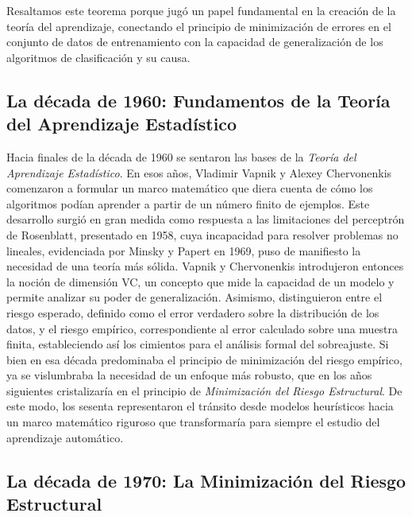 \documentclass{report}
\begin{document}
Resaltamos este teorema porque jugó un papel fundamental en la creación de la teoría del aprendizaje, conectando el
principio de minimización de errores en el conjunto de datos de entrenamiento con la capacidad de generalización
de los algoritmos de clasificación y su causa.\newline


\subsection{La década de 1960: Fundamentos de la Teoría del Aprendizaje Estadístico}

Hacia finales de la década de 1960 se sentaron las bases de la \textit{Teoría del Aprendizaje Estadístico}. En esos años, Vladimir Vapnik y Alexey Chervonenkis comenzaron a formular un marco matemático que diera cuenta de cómo los algoritmos podían aprender a partir de un número finito de ejemplos. Este desarrollo surgió en gran medida como respuesta a las limitaciones del perceptrón de Rosenblatt, presentado en 1958, cuya incapacidad para resolver problemas no lineales, evidenciada por Minsky y Papert en 1969, puso de manifiesto la necesidad de una teoría más sólida. Vapnik y Chervonenkis introdujeron entonces la noción de dimensión VC, un concepto que mide la capacidad de un modelo y permite analizar su poder de generalización. Asimismo, distinguieron entre el riesgo esperado, definido como el error verdadero sobre la distribución de los datos, y el riesgo empírico, correspondiente al error calculado sobre una muestra finita, estableciendo así los cimientos para el análisis formal del sobreajuste. Si bien en esa década predominaba el principio de minimización del riesgo empírico, ya se vislumbraba la necesidad de un enfoque más robusto, que en los años siguientes cristalizaría en el principio de \textit{Minimización del Riesgo Estructural}. De este modo, los sesenta representaron el tránsito desde modelos heurísticos hacia un marco matemático riguroso que transformaría para siempre el estudio del aprendizaje automático.

\subsection{La década de 1970: La Minimización del Riesgo Estructural}
\end{document}
